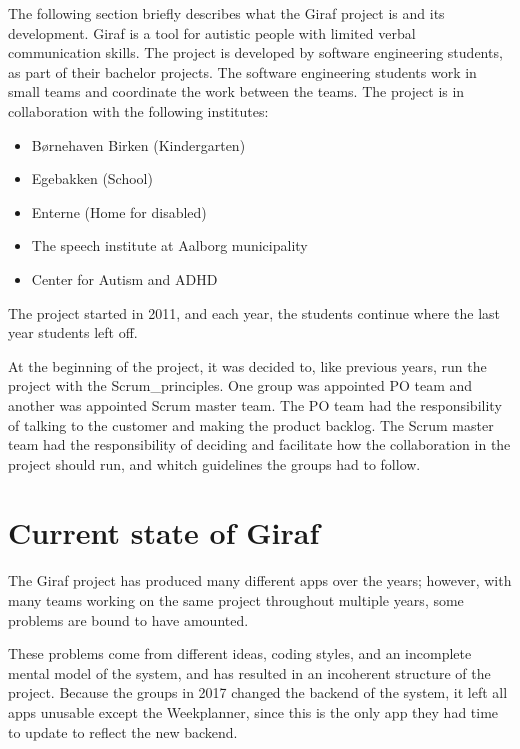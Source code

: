 The following section briefly describes what the Giraf project is and its development. 
Giraf is a tool for autistic people with limited verbal communication skills. The project is developed by software engineering students, as part of their bachelor projects. The software engineering students work in small teams and coordinate the work between the teams. The project is in collaboration with the following institutes\cite{GirafWebsite}:

\begin{itemize}
    \item Børnehaven Birken (Kindergarten) \cite{bhBirken}
    \item Egebakken (School) \cite{egebakken}
    \item Enterne (Home for disabled) \cite{enterne}
    \item The speech institute at Aalborg municipality %
    \item Center for Autism and ADHD \cite{center_for_autism}
\end{itemize}

The project started in 2011, and each year, the students continue where the last year students left off.

At the beginning of the project, it was decided to, like previous years, run the project with the \gls{Scrum_principles}. One group was appointed \gls{PO} team and another was appointed Scrum master team. The \gls{PO} team had the responsibility of talking to the customer and making the product backlog. The Scrum master team had the responsibility of deciding and facilitate how the collaboration in the project should run, and whitch guidelines the groups had to follow.

\section{Current state of Giraf}

The Giraf project has produced many different apps over the years; however, with many teams working on the same project throughout multiple years, some problems are bound to have amounted.

These problems come from different ideas, coding styles, and an incomplete mental model of the system, and has resulted in an incoherent structure of the project. Because the groups in 2017 \cite{SW608F18} changed the backend of the system, it left all apps unusable except the Weekplanner, since this is the only app they had time to update to reflect the new backend.

